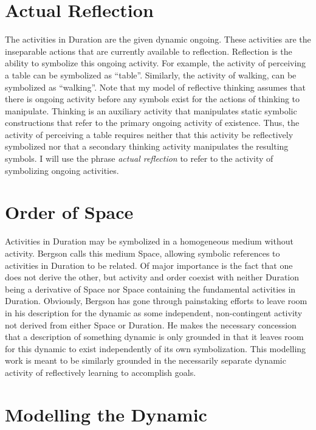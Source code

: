 \section{Actual Reflection}

The activities in Duration are the given dynamic ongoing.  These
activities are the inseparable actions that are currently available to
reflection.  Reflection is the ability to symbolize this ongoing
activity.  For example, the activity of perceiving a table can be
symbolized as ``table''.  Similarly, the activity of walking, can be
symbolized as ``walking''.  Note that my model of reflective thinking
assumes that there is ongoing activity before any symbols exist for
the actions of thinking to manipulate.  Thinking is an auxiliary
activity that manipulates static symbolic constructions that refer to
the primary ongoing activity of existence.  Thus, the activity of
perceiving a table requires neither that this activity be reflectively
symbolized nor that a secondary thinking activity manipulates the
resulting symbols.  I will use the phrase \emph{actual reflection} to
refer to the activity of symbolizing ongoing activities.

\section{Order of Space}

Activities in Duration may be symbolized in a homogeneous medium
without activity.  Bergson calls this medium Space, allowing symbolic
references to activities in Duration to be related.  Of major
importance is the fact that one does not derive the other, but
activity and order coexist with neither Duration being a derivative of
Space nor Space containing the fundamental activities in Duration.
Obviously, Bergson has gone through painstaking efforts to leave room
in his description for the dynamic as some independent, non-contingent
activity not derived from either Space or Duration.  He makes the
necessary concession that a description of something dynamic is only
grounded in that it leaves room for this dynamic to exist
independently of its own symbolization.  This modelling work is meant
to be similarly grounded in the necessarily separate dynamic activity
of reflectively learning to accomplish goals.

\section{Modelling the Dynamic}
\label{section:modelling_the_dynamic}


